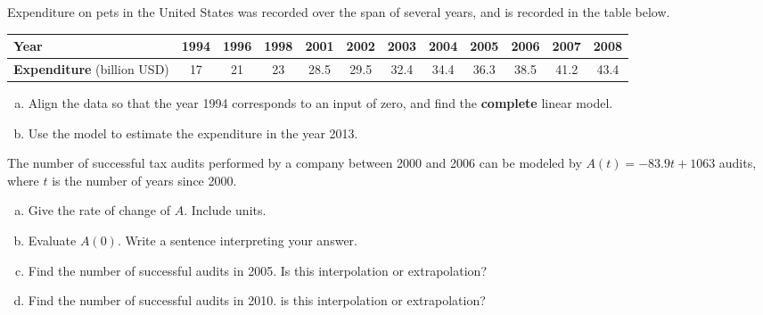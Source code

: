 \documentclass[notes]{subfiles}
\begin{document}
		\begin{ex} Expenditure on pets in the United States was recorded over the span of several years, and is recorded in the table below.
			\begin{center}
				{\renewcommand{\arraystretch}{1.2}
				\begin{tabular}{|P{1in}||c|c|c|c|c|c|c|c|c|c|c|}\hline
					\textbf{Year} & 1994 & 1996 & 1998 & 2001 & 2002 & 2003 & 2004 & 2005 & 2006 & 2007 & 2008 \\ \hline
					\textbf{Expenditure} (billion USD) & 17 & 21 & 23 & 28.5 & 29.5 & 32.4 & 34.4 & 36.3 & 38.5 & 41.2 & 43.4\\ \hline
				\end{tabular}
				}
			\end{center}
			\begin{enumerate}[(a)]
				\item Align the data so that the year 1994 corresponds to an input of zero, and find the \textbf{complete} linear model.
				\item Use the model to estimate the expenditure in the year 2013.
			\end{enumerate}
		\end{ex}

		\begin{ex}
			The number of successful tax audits performed by a company between 2000 and 2006 can be modeled by $A(t) = -83.9t + 1063$ audits, where $t$ is the number of years since 2000.  
			\begin{enumerate}[(a)]
				\item Give the rate of change of $A$. Include units.
				\item Evaluate $A(0)$.  Write a sentence interpreting your answer.
				\item Find the number of successful audits in 2005.  Is this interpolation or extrapolation?
				\item Find the number of successful audits in 2010.  is this interpolation or extrapolation?
			\end{enumerate}
		\end{ex}
			\newpage
\end{document}

